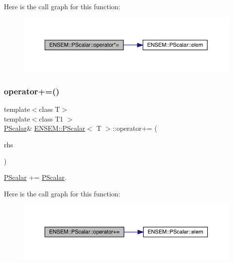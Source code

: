 Here is the call graph for this function\+:
\nopagebreak
\begin{figure}[H]
\begin{center}
\leavevmode
\includegraphics[width=350pt]{d3/d27/classENSEM_1_1PScalar_addccfa9164f9d80554657387932185c4_cgraph}
\end{center}
\end{figure}
\mbox{\label{classENSEM_1_1PScalar_a9c8d9e51f9d0a13b4b4aa9992812eea8}} 
\subsubsection{\texorpdfstring{operator+=()}{operator+=()}\hspace{0.1cm}{\footnotesize\ttfamily [1/2]}}
{\footnotesize\ttfamily template$<$class T$>$ \\
template$<$class T1 $>$ \\
\mbox{\hyperlink{classENSEM_1_1PScalar}{P\+Scalar}}\& \mbox{\hyperlink{classENSEM_1_1PScalar}{E\+N\+S\+E\+M\+::\+P\+Scalar}}$<$ T $>$\+::operator+= (\begin{DoxyParamCaption}\item[{const \mbox{\hyperlink{classENSEM_1_1PScalar}{P\+Scalar}}$<$ T1 $>$ \&}]{rhs }\end{DoxyParamCaption})\hspace{0.3cm}{\ttfamily [inline]}}



\mbox{\hyperlink{classENSEM_1_1PScalar}{P\+Scalar}} += \mbox{\hyperlink{classENSEM_1_1PScalar}{P\+Scalar}}. 

Here is the call graph for this function\+:
\nopagebreak
\begin{figure}[H]
\begin{center}
\leavevmode
\includegraphics[width=350pt]{d3/d27/classENSEM_1_1PScalar_a9c8d9e51f9d0a13b4b4aa9992812eea8_cgraph}
\end{center}
\end{figure}
\mbox{\label{classENSEM_1_1PScalar_a9c8d9e51f9d0a13b4b4aa9992812eea8}} 
